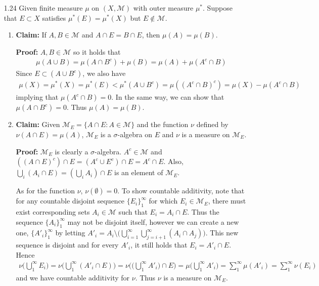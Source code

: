 \documentclass[11pt,letter]{article}
\begin{document}
\begin{enumerate}
    \item[1.24] Given finite measure $\mu$ on $(X,\mathcal{M})$ with outer measure $\mu^*$. Suppose that $E \subset X$ satisfies $\mu^*(E) = \mu^*(X)$ but $E \not \in \mathcal{M}$.
    
    \begin{enumerate}
        \item \textbf{Claim:} If $A,B \in \mathcal{M}$ and $A \cap E = B \cap E$, then $\mu(A) = \mu (B)$.

        \textbf{Proof:} $A,B \in \mathcal{M}$ so it holds that 
        \begin{align*}
            \mu (A \cup B) = \mu(A \cap B^c) + \mu(B) = \mu(A) + \mu(A^c \cap B)
        \end{align*}
        Since $E \subset (A \cup B^c)$, we also have
        \begin{align*}
            \mu(X) = \mu^*(X) = \mu^*(E) < \mu^*(A \cup B^c) = \mu((A^c \cap B)^c) = \mu(X) - \mu(A^c \cap B)
        \end{align*}
        implying that $\mu(A^c \cap B) = 0$. In the same way, we can show that $\mu(A \cap B^c) = 0$. Thus $\mu(A) = \mu(B)$.

        \item \textbf{Claim:} Given $\mathcal{M}_E = \{A \cap E: A \in \mathcal{M} \}$ and the function $\nu$ defined by $\nu(A \cap E) = \mu(A)$, $\mathcal{M}_E$ is a $\sigma$-algebra on $E$ and $\nu$ is a measure on $\mathcal{M}_E$.

        \textbf{Proof:} $\mathcal{M}_E$ is clearly a $\sigma$-algebra. $A^c \in \mathcal{M}$ and $((A \cap E)^c) \cap E = (A^c \cup E^c) \cap E = A^c \cap E$. Also, $\bigcup_i(A_i \cap E) = (\bigcup_i A_i) \cap E$ is an element of $\mathcal{M}_E$.

        As for the function $\nu$, $\nu(\emptyset) = 0$. To show countable additivity, note that for any countable disjoint sequence $\{E_i\}_1^\infty$ for which $E_i \in \mathcal{M}_E$, there must exist corresponding sets $A_i \in \mathcal{M}$ such that $E_i = A_i \cap E$. Thus the sequence $\{A_i\}_1^\infty$ may not be disjoint itself, however we can create a new one, $\{A'_i\}_1^\infty$ by letting $A'_i = A_i \setminus \big(\bigcup_{i=1}^\infty\bigcup_{j=i+1}^\infty (A_i \cap A_j)\big)$. This new sequence is disjoint and for every $A'_i$, it still holds that $E_i = A'_i \cap E$. Hence
        \begin{align*}
            \nu\big(\bigcup_1^\infty E_i\Big) = \nu\Big(\bigcup_1^\infty (A'_i \cap E)\Big) = \nu\Big(\big(\bigcup_1^\infty A'_i \big) \cap E \Big) = \mu\Big(\bigcup_1^\infty A'_i \Big) = \sum\limits_1^\infty \mu(A'_i) = \sum\limits_1^\infty \nu(E_i)
        \end{align*}
        and we have countable additivity for $\nu$. Thus $\nu$ is a measure on $\mathcal{M}_E$.
    \end{enumerate}
    

\end{enumerate}
\end{document}
